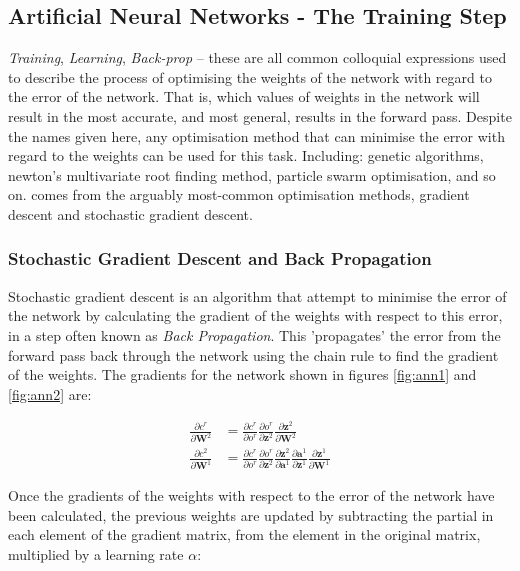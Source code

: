 \documentclass[a4paper]{article}
\begin{document}
\subsection{Artificial Neural Networks - The Training Step} \label{training}
\textit{Training}, \textit{Learning}, \textit{Back-prop} -- these are all 
common colloquial expressions used to describe the process of optimising 
the weights of the network with regard to the error of the network. 
That is, which values of weights in the
network will result in the most accurate, and most general, results in the
forward pass. Despite the names given here, any optimisation method that
can minimise the error with regard to the weights can be used for this task.
Including: genetic algorithms, newton's multivariate root finding method, 
particle swarm optimisation, and so on. 
 comes from the arguably 
most-common optimisation methods, gradient descent and stochastic gradient
descent.

\subsubsection{Stochastic Gradient Descent and Back Propagation}
Stochastic gradient descent is an algorithm that attempt to minimise the error
of the network by calculating the gradient of the weights with respect to this
error, in a step often known as \textit{Back Propagation}. This 'propagates'
the error from the forward pass back through the network using the chain rule
to find the gradient of the weights. The gradients for the
network shown in figures \ref{fig:ann1} and \ref{fig:ann2} are:

\begin{align*}
				\frac {\partial c^r}{\partial \boldsymbol{W}^2} &= 
						\frac{\partial c^r}{\partial o^r} \frac{\partial o^r}{\partial
						\boldsymbol{z}^2} \frac{\partial \boldsymbol{z}^2}{\partial
						\boldsymbol{W}^2} \\
				\frac{\partial c^2}{\partial \boldsymbol{W}^1} &= 
						\frac{\partial c^r}{\partial o^r} \frac{\partial o^r}{\partial
						\boldsymbol{z}^2} \frac{\partial \boldsymbol{z}^2}{\partial
						\boldsymbol{a}^1} \frac{\partial \boldsymbol{a}^1}{\partial
						\boldsymbol{z}^1} \frac{\partial \boldsymbol{z}^1}{\partial
						\boldsymbol{W}^1}
\end{align*}

Once the gradients of the weights with respect to the error of the network 
have been calculated, the previous weights are updated by subtracting the
partial in each element of the gradient matrix, from the element in the
original matrix, multiplied by a learning rate $\alpha$:
\end{document}
